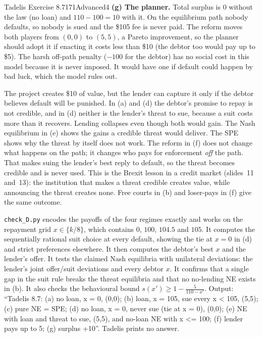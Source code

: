 \begin{exsol}{Tadelis Exercise 8.7}{171}{Advanced}{4}
\textbf{(g) The planner.} Total surplus is $0$ without the law (no loan) and $110 - 100 = 10$ with it.
On the equilibrium path nobody defaults, so nobody is sued and the \$105 fee is never paid. The
reform moves both players from $(0,0)$ to $(5,5)$, a Pareto improvement, so the planner should adopt
it if enacting it costs less than \$10 (the debtor too would pay up to \$5). The harsh off-path
penalty ($-100$ for the debtor) has no social cost in this model because it is never imposed. It
would have one if default could happen by bad luck, which the model rules out.

\interp The project creates \$10 of value, but the lender can capture it only if the debtor
believes default will be punished. In (a) and (d) the debtor's promise to repay is not credible,
and in (d) neither is the lender's threat to sue, because a suit costs more than it recovers.
Lending collapses even though both would gain. The Nash equilibrium in (e) shows the gains a
credible threat would deliver. The SPE shows why the threat by itself does not work. The reform in (f) does not change what happens
on the path; it changes who pays for enforcement \emph{off} the path. That makes suing the
lender's best reply to default, so the threat becomes credible and is never used. This is the
Brexit lesson in a credit market (slides~11 and~13): the institution that makes a threat credible
creates value, while announcing the threat creates none. Free courts in (b) and loser-pays in (f)
give the same outcome.

\verify \texttt{check\_D.py} encodes the payoffs of the four regimes exactly and works on the
repayment grid $x \in \{k/8\}$, which contains $0$, $100$, $104.5$ and $105$. It computes the
sequentially rational suit choice at every default, showing the tie at $x=0$ in (d) and strict
preferences elsewhere. It then computes the debtor's best $x$ and the lender's offer. It tests
the claimed Nash equilibria with unilateral deviations: the lender's joint offer/suit deviations
and every debtor $x$. It confirms that a single gap in the suit rule breaks the threat equilibria
and that no no-lending NE exists in (b). It also checks the behavioural bound
$s(x') \ge 1 - \frac5{110 - x'}$. Output: ``Tadelis 8.7: (a) no loan, x = 0, (0,0); (b) loan, x =
105, sue every x < 105, (5,5); (c) pure NE = SPE; (d) no loan, x = 0, never sue (tie at x = 0), (0,0);
(e) NE with loan and threat to sue, (5,5), and no-loan NE with x <= 100; (f) lender pays up to 5;
(g) surplus +10''. Tadelis prints no answer.


\end{exsol}
